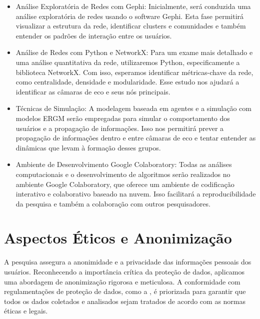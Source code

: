 \begin{itemize}
	\item Análise Exploratória de Redes com Gephi: Inicialmente, será conduzida uma análise exploratória de redes usando o software Gephi. Esta fase permitirá visualizar a estrutura da rede, identificar clusters e comunidades e também entender os padrões de interação entre os usuários.
	\item Análise de Redes com Python e NetworkX: Para um exame mais detalhado e uma análise quantitativa da rede, utilizaremos Python, especificamente a biblioteca NetworkX. Com isso, esperamos identificar métricas-chave da rede, como centralidade, densidade e modularidade. Esse estudo nos ajudará a identificar as câmaras de eco e seus nós principais.
	\item Técnicas de Simulação: A modelagem baseada em agentes e a simulação com modelos ERGM serão empregadas para simular o comportamento dos usuários e a propagação de informações. Isso nos permitirá prever a propagação de informações dentro e entre câmaras de eco e tentar entender as dinâmicas que levam à formação desses grupos.
	\item Ambiente de Desenvolvimento Google Colaboratory: Todas as análises computacionais e o desenvolvimento de algoritmos serão realizados no ambiente Google Colaboratory, que oferece um ambiente de codificação interativo e colaborativo baseado na nuvem. Isso facilitará a reproducibilidade da pesquisa e também a colaboração com outros pesquisadores.
\end{itemize}

\section{Aspectos Éticos e Anonimização}
\label{sec:anonimizacao}

A pesquisa assegura a anonimidade e a privacidade das informações pessoais dos usuários. Reconhecendo a importância crítica da proteção de dados, aplicamos uma abordagem de anonimização rigorosa e meticulosa. A conformidade com regulamentações de proteção de dados, como a , é priorizada para garantir que todos os dados coletados e analisados sejam tratados de acordo com as normas éticas e legais.

